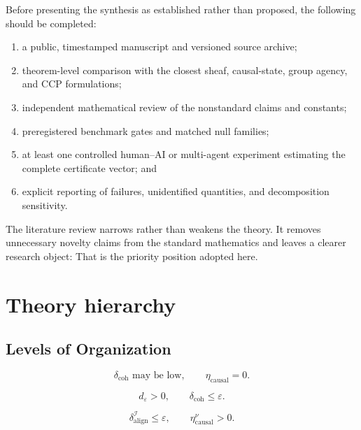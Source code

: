 Before presenting the synthesis as established rather than proposed, the
following should be completed:
\begin{enumerate}
\item a public, timestamped manuscript and versioned source archive;
\item theorem-level comparison with the closest sheaf, causal-state, group
 agency, and CCP formulations;
\item independent mathematical review of the nonstandard claims and constants;
\item preregistered benchmark gates and matched null families;
\item at least one controlled human--AI or multi-agent experiment estimating
 the complete certificate vector; and
\item explicit reporting of failures, unidentified quantities, and
 decomposition sensitivity.
\end{enumerate}


The literature review narrows rather than weakens the theory. It removes
unnecessary novelty claims from the standard mathematics and leaves a clearer
research object:
That is the priority position adopted here.


\chapter{Theory hierarchy}\label{SRWT:book:chapter-90}


\section{Levels of Organization}

\[
\delta_{\mathrm{coh}}\text{ may be low},
\qquad
\eta_{\mathrm{causal}}=0.
\]

\[
d_\varepsilon>0,
\qquad
\delta_{\mathrm{coh}}\leq\varepsilon.
\]

\[
\delta_{\mathrm{align}}^{\mathcal I}\leq\varepsilon,
\qquad
\eta_{\mathrm{causal}}^\nu>0.
\]

